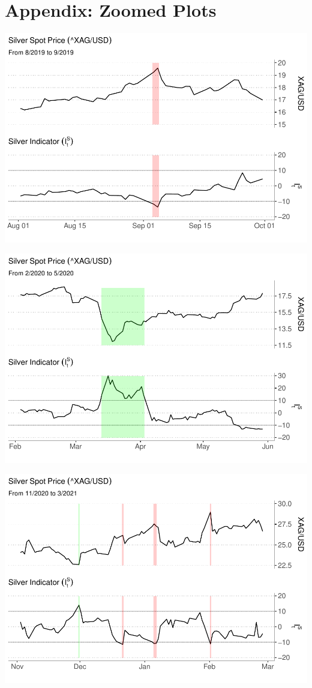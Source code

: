 \documentclass[
  12pt,
]{article}
\begin{document}
\hypertarget{appendix-zoomed-plots}{%
\section*{Appendix: Zoomed Plots}\label{appendix-zoomed-plots}}

\includegraphics{silver-market-timing_files/figure-latex/highlighted-plot2-1.pdf}

\includegraphics{silver-market-timing_files/figure-latex/highlighted-plot3-1.pdf}

\includegraphics{silver-market-timing_files/figure-latex/highlighted-plot5-1.pdf}
\end{document}
